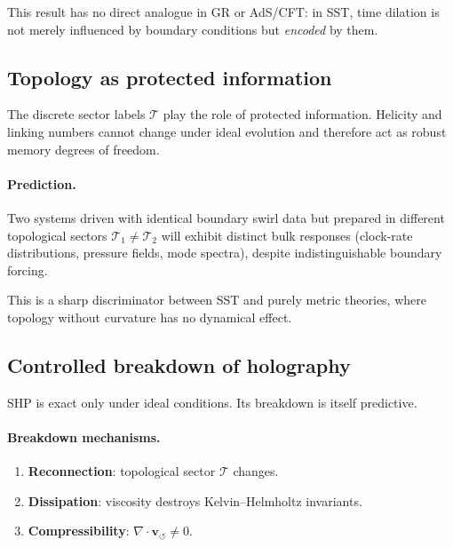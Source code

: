 \documentclass[11pt]{article}
\begin{document}
            This result has no direct analogue in GR or AdS/CFT: in SST, time dilation is not
            merely influenced by boundary conditions but \emph{encoded} by them.

    \subsection{Topology as protected information}

    The discrete sector labels $\mathcal{T}$ play the role of protected information.
    Helicity and linking numbers cannot change under ideal evolution and therefore act
    as robust memory degrees of freedom.

    \paragraph{Prediction.}
        Two systems driven with identical boundary swirl data but prepared in different
        topological sectors $\mathcal{T}_1\neq\mathcal{T}_2$ will exhibit distinct bulk
        responses (clock-rate distributions, pressure fields, mode spectra), despite
        indistinguishable boundary forcing.

        This is a sharp discriminator between SST and purely metric theories, where
        topology without curvature has no dynamical effect.

    \subsection{Controlled breakdown of holography}

    SHP is exact only under ideal conditions. Its breakdown is itself predictive.

    \paragraph{Breakdown mechanisms.}
        \begin{enumerate}
            \item \textbf{Reconnection}: topological sector $\mathcal{T}$ changes.
            \item \textbf{Dissipation}: viscosity destroys Kelvin--Helmholtz invariants.
            \item \textbf{Compressibility}: $\nabla\cdot\mathbf{v}_{\!\boldsymbol{\circlearrowleft}}\neq 0$.
        \end{enumerate}
\end{document}
